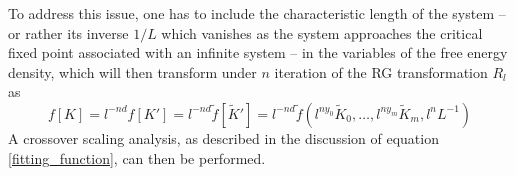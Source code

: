 \documentclass[class=report, float=false, crop=false]{standalone}
\begin{document}
To address this issue, one has to include the characteristic length of the system -- or rather its inverse $1/L$ which vanishes as the system approaches the critical fixed point associated with an infinite system -- in the variables of the free energy density, which will then transform under $n$ iteration of the RG transformation $R_l$ as
\begin{equation}
f[K] = l^{-nd} f[K'] = l^{-nd} \tilde{f}[\tilde{K}'] = l^{-nd} \tilde{f}(l^{ny_0}\tilde{K}_0,\ldots,l^{ny_m}\tilde{K}_m,l^nL^{-1})
\end{equation}
A crossover scaling analysis, as described in the discussion of equation \ref{fitting_function}, can then be performed.

% 
\end{document}
